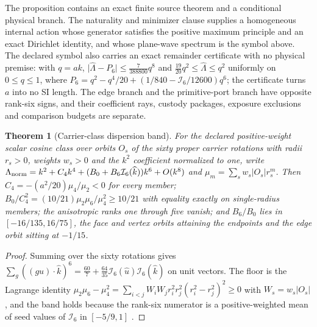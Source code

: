 \documentclass[11pt]{article}
\newtheorem{theorem}{Theorem}[section]
\theoremstyle{definition}
\theoremstyle{remark}
\begin{document}
The proposition contains an exact finite source theorem and a conditional
physical branch. The naturality and minimizer clause supplies a homogeneous
internal action whose generator satisfies the positive maximum principle and
an exact Dirichlet identity, and whose plane-wave spectrum is the symbol
above. The declared symbol also carries an exact remainder certificate with
no physical premise: with $q=ak$,
$\lvert\widehat\Lambda-P_6\rvert\le\tfrac{7}{388800}q^8$ and
$\tfrac{19}{20}q^2\le\widehat\Lambda\le q^2$ uniformly on $0\le q\le1$,
where $P_6=q^2-q^4/20+(1/840-\mathcal I_6/12600)q^6$; the certificate turns
$a$ into no SI length. The edge branch and the primitive-port branch have
opposite rank-six signs, and their coefficient rays, custody packages,
exposure exclusions and comparison budgets are separate.

\begin{theorem}[Carrier-class dispersion band]
\label{thm:carrier-class-band}
For the declared positive-weight scalar cosine class over orbits $O_s$ of the
sixty proper carrier rotations with radii $r_s>0$, weights $w_s>0$ and the
$k^2$ coefficient normalized to one, write
$\Lambda_{\rm norm}=k^2+C_4k^4+(B_0+B_6\mathcal I_6(\widehat k))k^6+O(k^8)$
and $\mu_m=\sum_sw_s|O_s|r_s^m$. Then $C_4=-(a^2/20)\mu_4/\mu_2<0$ for every
member; $B_0/C_4^2=(10/21)\mu_2\mu_6/\mu_4^2\ge10/21$ with equality exactly
on single-radius members; the anisotropic ranks one through five vanish; and
$B_6/B_0$ lies in $[-16/135,16/75]$, the face and vertex orbits attaining the
endpoints and the edge orbit sitting at $-1/15$.
\end{theorem}

\begin{proof}
Summing over the sixty rotations gives
$\sum_g((gu)\!\cdot\!\widehat k)^6=\tfrac{60}{7}
+\tfrac{64}{35}\mathcal I_6(\widehat u)\mathcal I_6(\widehat k)$ on unit
vectors. The floor is the Lagrange identity
$\mu_2\mu_6-\mu_4^2=\sum_{i<j}W_iW_jr_i^2r_j^2(r_i^2-r_j^2)^2\ge0$ with $W_s=w_s|O_s|$, and the
band holds because the rank-six numerator is a positive-weighted mean of seed
values of $\mathcal I_6$ in $[-5/9,1]$ \cite{ophrepo}.
\end{proof}
\end{document}
